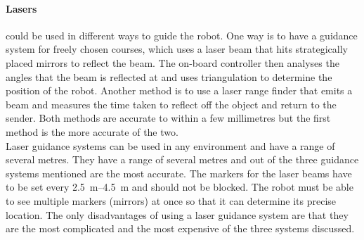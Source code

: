         \paragraph{Lasers} could be used in different ways to guide the robot. One way is to have a guidance system for freely chosen courses, which uses a laser beam that hits strategically placed mirrors to reflect the beam. The on-board controller then analyses the angles that the beam is reflected at and uses triangulation to determine the position of the robot. Another method is to use a laser range finder that emits a beam and measures the time taken to reflect off the object and return to the sender. Both methods are accurate to within a few millimetres but the first method is the more accurate of the two.\\
        Laser guidance systems can be used in any environment and have a range of several metres. They have a range of several metres and out of the three guidance systems mentioned are the most accurate. The markers for the laser beams have to be set every \SIrange{2.5}{4.5}{\meter} and should not be blocked. The robot must be able to see multiple markers (mirrors) at once so that it can determine its precise location. The only disadvantages of using a laser guidance system are that they are the most complicated and the most expensive of the three systems discussed.

